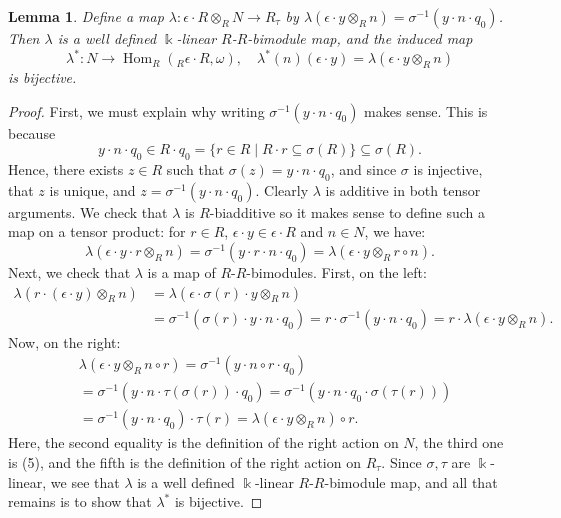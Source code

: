 \documentclass{amsart}
\newtheorem{lem}[equation]{Lemma}
\theoremstyle{definition}
\newcommand{\opn}{\operatorname}
\renewcommand{\k}{\Bbbk}
\numberwithin{equation}{section}
\begin{document}
\begin{lem}\label{lem:maplambda}
Define a map $\lambda:\epsilon\cdot R\otimes_R N \to R_{\tau}$ by
$\lambda(\epsilon \cdot y\otimes_R n) = \sigma^{-1}(y\cdot n \cdot q_0)$.
Then $\lambda$ is a well defined $\k$-linear $R$-$R$-bimodule map, and the induced map 
\[
\lambda^* : N \to \opn{Hom}_R({}_R \epsilon \cdot R,\omega), \quad \lambda^*(n) (\epsilon \cdot y)  = \lambda(\epsilon\cdot y \otimes_R n)
\]
is bijective.
\end{lem}
\begin{proof}
First, we must explain why writing $\sigma^{-1}(y\cdot n \cdot q_0)$ makes sense.
This is because 
\[
y\cdot n \cdot q_0 \in R \cdot q_0 = \{r \in R \mid R\cdot r \subseteq \sigma(R)\} \subseteq \sigma(R).
\]
Hence, there exists $z \in R$ such that $\sigma(z) = y\cdot n \cdot q_0$,
and since $\sigma$ is injective, that $z$ is unique, and $z = \sigma^{-1}(y\cdot n \cdot q_0)$.
Clearly $\lambda$ is additive in both tensor arguments. 
We check that $\lambda$ is $R$-biadditive so it makes sense to define such a map on a tensor product:
for $r \in R$, $\epsilon \cdot y \in \epsilon \cdot R$ and $n \in N$,
we have:
\[
\lambda(\epsilon\cdot y \cdot r \otimes_R n) = \sigma^{-1}(y\cdot r \cdot n \cdot q_0) = \lambda(\epsilon\cdot y \otimes_R r \circ n).
\]
Next, we check that $\lambda$ is a map of $R$-$R$-bimodules.
First, on the left:
\begin{align*}
\lambda(r\cdot (\epsilon\cdot y)\otimes_R n) &= 
\lambda(\epsilon\cdot \sigma(r)\cdot y\otimes_R n) \\ &= 
\sigma^{-1} (\sigma(r)\cdot y\cdot n \cdot q_0) = r\cdot \sigma^{-1}(y\cdot n \cdot q_0) = r\cdot \lambda(\epsilon\cdot y\otimes_R n).
\end{align*}
Now, on the right:
\begin{align*}
& \lambda(\epsilon\cdot y\otimes_R n\circ r) = \sigma^{-1}(y\cdot n \circ r \cdot q_0) \\ &= \sigma^{-1}(y\cdot n\cdot \tau(\sigma(r)) \cdot q_0) = 
\sigma^{-1}(y\cdot n \cdot q_0 \cdot \sigma(\tau(r))) \\ &=
\sigma^{-1}(y\cdot n \cdot q_0) \cdot \tau(r) =
\lambda(\epsilon\cdot y\otimes_R n )\circ r.
\end{align*}
Here, the second equality is the definition of the right action on $N$,
the third one is (5),
and the fifth is the definition of the right action on $R_{\tau}$.
Since $\sigma, \tau$ are $\k$-linear, we see that $\lambda$ is a well defined $\k$-linear $R$-$R$-bimodule map,
and all that remains is to show that $\lambda^*$ is bijective.

\end{proof}
\end{document}
